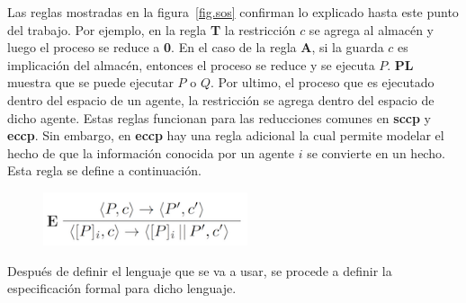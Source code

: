 Las reglas mostradas en la figura~\ref{fig.sos} confirman lo explicado hasta este punto del trabajo. Por ejemplo, en la regla \textbf{T} la restricci\'on $c$ se agrega al almac\'en y luego el proceso se reduce a \textbf{0}. En el caso de la regla \textbf{A}, si la guarda $c$ es implicaci\'on del almac\'en, entonces el proceso se reduce y se ejecuta $P$. \textbf{PL} muestra que se puede ejecutar $P$ o $Q$. Por ultimo, el proceso que es ejecutado dentro del espacio de un agente, la restricci\'on se agrega dentro del espacio de dicho agente. Estas reglas funcionan para las reducciones comunes en \textbf{sccp} y \textbf{eccp}. Sin embargo, en \textbf{eccp} hay una regla adicional la cual permite modelar el hecho de que la informaci\'on conocida por un agente $i$ se convierte en un hecho. Esta regla se define a continuaci\'on. 

\begin{figure}[pthb]
  \centering
  \begin{minipage}[c]{0.8\textwidth}%
	\begin{center}
    \includegraphics[width=6cm]{images/eccp_sos.png}
  \end{center}
\end{minipage}
  \label{fig2.sos}
\end{figure}

Despu\'es de definir el lenguaje que se va a usar, se procede a definir la especificaci\'on formal para dicho lenguaje. 













